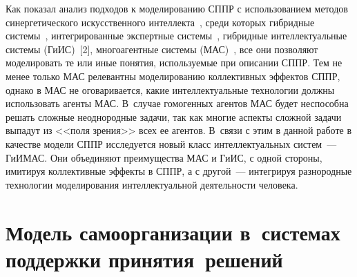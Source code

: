 \begin{multicols}{2}
  Как показал анализ подходов к моделированию СППР с использованием 
методов синергетического искусственного интеллекта~\cite{5-lis}, среди 
которых гибридные сис\-те\-мы~\cite{13-lis}, интегрированные экспертные 
системы~\cite{14-lis}, гибридные интеллектуальные системы (ГиИС)~[2], 
многоагентные системы (МАС)~\cite{11-lis}, все они позволяют моделировать 
те или иные понятия, используемые при описании СППР. Тем не менее только 
МАС релевантны моделированию коллективных эффектов СППР, однако в 
МАС не оговаривается, какие интеллектуальные технологии должны 
использовать агенты МАС. В~случае гомогенных агентов МАС будет 
неспособна решать сложные неоднородные задачи, так как многие аспекты 
сложной задачи выпадут из <<поля зрения>> всех ее агентов. В~связи с этим в 
данной работе в качестве модели СППР исследуется новый класс 
интеллектуальных сис\-тем~--- ГиИМАС. Они объединяют преимущества МАС и ГиИС, с одной 
стороны, имитируя коллективные эффекты в СППР, а с другой~--- интегрируя 
разнородные технологии моделирования интеллектуальной деятельности 
человека. 
  
\section{Модель самоорганизации в~системах поддержки принятия~решений} 
  

\end{multicols}
